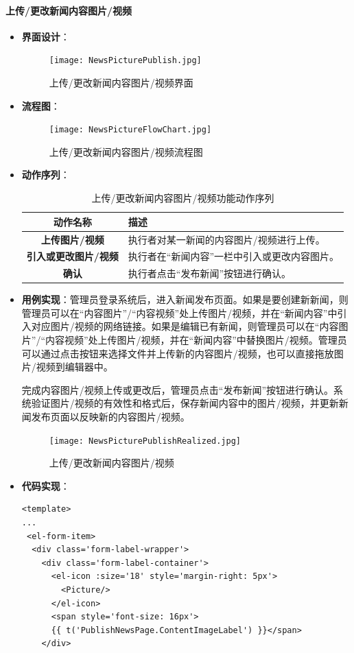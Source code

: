 \paragraph{上传/更改新闻内容图片/视频}
\begin{itemize}
	\item \textbf{界面设计}：
	\begin{figure}[H]
		\centering
		\texttt{[image: NewsPicturePublish.jpg]}
		\caption{上传/更改新闻内容图片/视频界面}
		\label{NewsPicturePublish}
	\end{figure}
	\item \textbf{流程图}：
	\begin{figure}[H]
		\centering
		\texttt{[image: NewsPictureFlowChart.jpg]}
		\caption{上传/更改新闻内容图片/视频流程图}
		\label{NewsPictureFlowChart}
	\end{figure}
	\item \textbf{动作序列}：
	\begin{table}[H]
		\centering
		\caption{上传/更改新闻内容图片/视频功能动作序列}
		\renewcommand\arraystretch{1.5}
		\begin{tabular}{|c|>{\raggedright\arraybackslash}p{10cm}|}
			\hline
			\textbf{动作名称} & \textbf{描述} \\ \hline
			\textbf{上传图片/视频} & 执行者对某一新闻的内容图片/视频进行上传。 \\ \hline
			\textbf{引入或更改图片/视频} & 执行者在“新闻内容”一栏中引入或更改内容图片。 \\ \hline
			\textbf{确认} & 执行者点击“发布新闻”按钮进行确认。 \\ \hline
		\end{tabular}
	\end{table}
	\item \textbf{用例实现}：管理员登录系统后，进入新闻发布页面。如果是要创建新新闻，则管理员可以在“内容图片”/“内容视频”处上传图片/视频，并在“新闻内容”中引入对应图片/视频的网络链接。如果是编辑已有新闻，则管理员可以在“内容图片”/“内容视频”处上传图片/视频，并在“新闻内容”中替换图片/视频。管理员可以通过点击按钮来选择文件并上传新的内容图片/视频，也可以直接拖放图片/视频到编辑器中。
	
	完成内容图片/视频上传或更改后，管理员点击“发布新闻”按钮进行确认。系统验证图片/视频的有效性和格式后，保存新闻内容中的图片/视频，并更新新闻发布页面以反映新的内容图片/视频。
	\begin{figure}[H]
		\centering
		\texttt{[image: NewsPicturePublishRealized.jpg]}
		\caption{上传/更改新闻内容图片/视频}
		\label{NewsPicturePublishRealized}
	\end{figure}
	\item \textbf{代码实现}：
	\begin{verbatim}
<template>
...
 <el-form-item>
  <div class='form-label-wrapper'>
    <div class='form-label-container'>
      <el-icon :size='18' style='margin-right: 5px'>
        <Picture/>
      </el-icon>
      <span style='font-size: 16px'>
      {{ t('PublishNewsPage.ContentImageLabel') }}</span>
    </div>
	

\end{verbatim}
\end{itemize}
